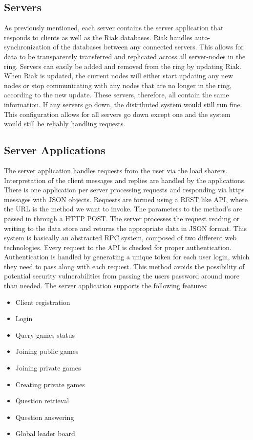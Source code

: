 \documentclass{dependencies/acm_proc_article-sp}
\begin{document}
\subsection{Servers}
As previously mentioned, each server contains the server application that responds to clients as well as the Riak databases.
Riak handles auto-synchronization of the databases between any connected servers.
This allows for data to be transparently transferred and replicated across all server-nodes in the ring.
Servers can easily be added and removed from the ring by updating Riak.
When Riak is updated, the current nodes will either start updating any new nodes or stop communicating with any nodes that are no longer in the ring, according to the new update.
These servers, therefore, all contain the same information.
If any servers go down, the distributed system would still run fine.
This configuration allows for all servers go down except one and the system would still be reliably handling requests.

\subsection{Server Applications}
The server application handles requests from the user via the load sharers.
Interpretation of the client messages and replies are handled by the applications. There is one application per server processing requests and responding via https messages with JSON objects. Requests are formed using a REST like API, where the URL is the method we want to invoke. The parameters to the method's are passed in through a HTTP POST. The server processes the request reading or writing to the data store and returns the appropriate data in JSON format. This system is basically an abstracted RPC system, composed of two different web technologies. Every request to the API is checked for proper authentication. Authentication is handled by generating a unique token for each user login, which they need to pass along with each request. This method avoids the possibility of potential security vulnerabilities from passing the users password around more than needed. 
The server application supports the following features:
\begin{itemize}	
\item Client registration
\item Login
\item Query games status
\item Joining public games
\item Joining private games
\item Creating private games
\item Question retrieval
\item Question answering
\item Global leader board
\end{itemize}
\end{document}
